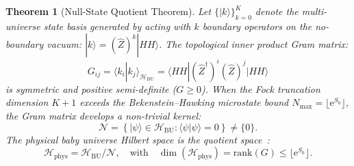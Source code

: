 \documentclass[11pt,a4paper,reqno]{article}
\theoremstyle{plain}
\newtheorem{theorem}{Theorem}[section]
\theoremstyle{definition}
\theoremstyle{remark}
\numberwithin{equation}{section}
\newcommand{\Hbu}{\mathcal{H}_{\mathrm{BU}}}
\newcommand{\Hphys}{\mathcal{H}_{\mathrm{phys}}}
\newcommand{\HH}{|HH\rangle}
\newcommand{\braHH}{\langle HH|}
\newcommand{\Zop}{\widehat{Z}}
\begin{document}
\begin{theorem}[Null-State Quotient Theorem]
\label{thm:null_state_quotient}
Let $\{|k\rangle\}_{k=0}^K$ denote the multi-universe state basis generated by acting with $k$ boundary operators on the no-boundary vacuum: $|k\rangle = (\Zop)^k \HH$. The topological inner product Gram matrix:
\begin{equation}
  G_{ij} = \langle k_i | k_j \rangle_{\Hbu} = \braHH (\Zop^\dagger)^i (\Zop)^j \HH
  \label{eq:gram_matrix_definition}
\end{equation}
is symmetric and positive semi-definite ($G \ge 0$). When the Fock truncation dimension $K+1$ exceeds the Bekenstein--Hawking microstate bound $N_{\max} = \lfloor \mathrm{e}^{S_0} \rfloor$, the Gram matrix develops a non-trivial kernel:
\begin{equation}
  \mathcal{N} = \left\{ |\psi\rangle \in \Hbu : \langle \psi | \psi \rangle = 0 \right\} \neq \{0\}.
\end{equation}
The physical baby universe Hilbert space is the quotient space~\cite{MarolfMaxfield2020,McNamaraVafa2020}:
\begin{equation}
  \Hphys = \Hbu / \mathcal{N}, \quad \mathrm{with} \quad \dim(\Hphys) = \mathrm{rank}(G) \le \lfloor \mathrm{e}^{S_0} \rfloor.
\end{equation}
\end{theorem}
\end{document}
